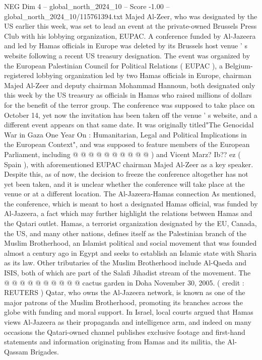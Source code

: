 \begin{textsample}{NEG Dim 4 – global\_north\_2024\_10 – Score -1.00 – global\_north\_2024\_10/115761394.txt}  \label{ex:f4_neg_056}
Majed Al-Zeer, who was designated by the US earlier this week, was set to lead an event at the private-owned Brussels Press Club with his lobbying organization, EUPAC.
A conference funded by Al-Jazeera and led by Hamas officials in Europe was deleted by its Brussels host venue ' s website following a recent US treasury designation.
The event was organized by the European Palestinian Council for Political Relations ( EUPAC ), a Belgium-registered lobbying organization led by two Hamas officials in Europe, chairman Majed Al-Zeer and deputy chairman Mohammad Hannoun, both designated only this week by the US treasury as officials in Hamas who raised millions of dollars for the benefit of the terror group.
The conference was supposed to take place on October 14, yet now the invitation has been taken off the venue ' s website, and a different event appears on that same date.
It was originally titled"The Genocidal War in Gaza One Year On : Humanitarian, Legal and Political Implications in the European Context", and was supposed to feature members of the European Parliament, including @ @ @ @ @ @ @ @ @ @ ) and Vicent Marz?
Ib?? ez ( Spain ), with aforementioned EUPAC chairman Majed Al-Zeer as a key speaker.
Despite this, as of now, the decision to freeze the conference altogether has not yet been taken, and it is unclear whether the conference will take place at the venue or at a different location.
The Al-Jazeera-Hamas connection As mentioned, the conference, which is meant to host a designated Hamas official, was funded by Al-Jazeera, a fact which may further highlight the relations between Hamas and the Qatari outlet.
Hamas, a terrorist organization designated by the EU, Canada, the US, and many other nations, defines itself as the Palestinian branch of the Muslim Brotherhood, an Islamist political and social movement that was founded almost a century ago in Egypt and seeks to establish an Islamic state with Sharia as its law.
Other tributaries of the Muslim Brotherhood include Al-Qaeda and ISIS, both of which are part of the Salafi Jihadist stream of the movement.
The @ @ @ @ @ @ @ @ @ @ cactus garden in Doha November 30, 2005. ( credit : REUTERS ) Qatar, who owns the Al-Jazeera network, is known as one of the major patrons of the Muslim Brotherhood, promoting its branches across the globe with funding and moral support.
In Israel, local courts argued that Hamas views Al-Jazeera as their propaganda and intelligence arm, and indeed on many occasions the Qatari-owned channel publishes exclusive footage and first-hand statements and information originating from Hamas and its militia, the Al-Qassam Brigades.

\end{textsample}
